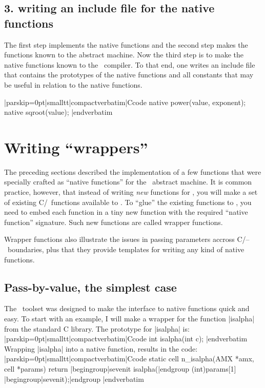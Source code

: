 \subsection{3. writing an include file for the native functions}
The first step implements the native functions and the second step makes the
functions known to the abstract machine. Now the third step is to make the
native functions known to the \Small\ compiler. To that end, one writes an
include file that contains the prototypes of the native functions and all
constants that may be useful in relation to the native functions.

\goodbreak
{}
\listingx\verbatim|parskip=0pt|smalltt|compactverbatim|Ccode
native power(value, exponent);
native sqroot(value);
|endverbatim\endlistingx

\section{Writing ``wrappers''}
The preceding sections described the implementation of a few functions that
were specially crafted as ``native functions'' for the \Small\ abstract machine.
It is common practice, however, that instead of writing {\it new\/} functions for
\Small, you will make a set of existing C/\Cpp\ functions available to \Small.
To ``glue'' the existing functions to \Small, you need to embed each function in
a tiny new function with the required ``native function'' signature. Such new
functions are called wrapper functions.

Wrapper functions also illustrate the issues in passing parameters accross
C/\Cpp -- \Small\ boundaries, plus that they provide templates for writing any
kind of native functions.

\subsection{Pass-by-value, the simplest case}
The \Small\ toolset was designed to make the interface to native functions quick
and easy. To start with an example, I will make a wrapper for the function |isalpha|
from the standard C library. The prototype for |isalpha| is:
\goodbreak
\listingx\verbatim|parskip=0pt|smalltt|compactverbatim|Ccode
int isalpha(int c);
|endverbatim\endlistingx
\goodbreak
Wrapping |isalpha| into a native function, results in the code:
\listingx\verbatim|parskip=0pt|smalltt|compactverbatim|Ccode
static cell n_isalpha(AMX *amx, cell *params)
{
  return |begingroup|sevenit isalpha(|endgroup (int)params[1] |begingroup|sevenit);|endgroup
}
|endverbatim\endlistingx

